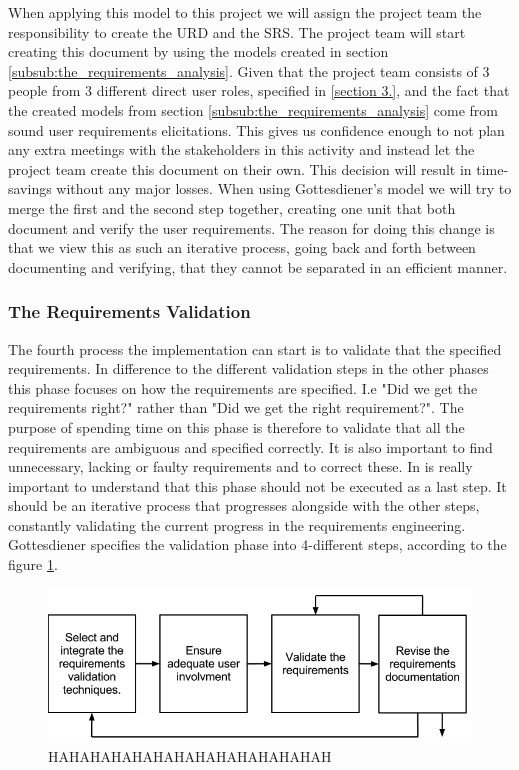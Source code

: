 \documentclass[a4paper]{article}
\begin{document}
When applying this model to this project we will assign the project team the responsibility to create the URD and the SRS. The project team will start creating this document by using the models created in section \ref{subsub:the_requirements_analysis}.  Given that the project team consists of 3 people from 3 different direct user roles, specified in \ref{section 3.}, and the fact that the created models from section \ref{subsub:the_requirements_analysis} come from sound user requirements elicitations. This gives us confidence enough to not plan any extra meetings with the stakeholders in this activity and instead let the project team create this document on their own. This decision will result in time-savings without any major losses. When using Gottesdiener's model we will try to merge the first and the second step together, creating one unit that both document and verify the user requirements. The reason for doing this change is that we view this as such an iterative process, going back and forth between documenting and verifying, that they cannot be separated in an efficient manner.  

\subsubsection{The Requirements Validation}
\label{subsub:the_requirements_validation}
The fourth process the implementation can start is to validate that the specified requirements. In difference to the different validation steps in the other phases this phase focuses on how the requirements are specified. I.e "Did we get the requirements right?" rather than "Did we get the right requirement?". The purpose of spending time on this phase is therefore to validate that all the requirements are ambiguous and specified correctly. It is also important to find unnecessary, lacking or faulty requirements and to correct these\cite{gott261262}. In is really important to understand that this phase should not be executed as a last step. It  should be an iterative process that progresses alongside with the other steps, constantly validating the current progress in the requirements engineering\cite{gott261262}. Gottesdiener specifies the validation phase into 4-different steps, according to the figure \ref{figure:validation}\cite{gott261262}. 


\begin{figure}[!ht]
	\centering
		\includegraphics[width=1\textwidth]{images/validations_model.png}
	\caption{HAHAHAHAHAHAHAHAHAHAHAHAHAH}
	\label{figure:validation}
\end{figure}
\end{document}
